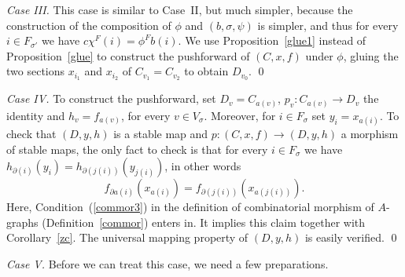 \documentclass[11pt]{amsart}
\theoremstyle{definition}
\theoremstyle{remark}
\newcommand{\del}{\partial}
\newcommand{\s}{_{\sigma}}
\theoremstyle{plain}
\theoremstyle{definition}
\theoremstyle{remark}
\begin{document}
{\em Case III\@. } This case is similar to Case~II, but much simpler, because
the construction of the composition of
\(\phi\) and \((b,\sigma,\psi)\) is simpler, and thus for every \(i\in F_{\sigma'}\)
we have \(c\chi^F(i)=\phi^Fb(i)\). We use
Proposition~\ref{glue1} instead of Proposition~\ref{glue} to construct the
pushforward of \((C,x,f)\) under \(\phi\), gluing
the two sections \(x_{i_1}\) and \(x_{i_2}\) of \(C_{v_1}=C_{v_2}\) to obtain
\(D_{v_0}\). \qed

{\em Case IV\@. } To construct the pushforward, set \(D_v=C_{a(v)}\),
\(p_v:C_{a(v)}\rightarrow D_v\) the identity and
\(h_v=f_{a(v)}\), for every \(v\in V\s\). Moreover, for \(i\in F\s\) set
\(y_i=x_{a(i)}\). To check that \((D,y,h)\) is a stable
map and \(p:(C,x,f)\rightarrow(D,y,h)\) a morphism of stable maps, the only fact
to check is that for every \(i\in F\s\) we
have \(h_{\del(i)}(y_i)=h_{\del(j(i))}(y_{j(i)})\), in other words
\[
f_{\del a(i)}(x_{a(i)})=f_{\del(j(i))}(x_{a(j(i))}).
\]
Here, Condition~(\ref{commor3}) in the definition of combinatorial morphism of
\(A\)-graphs (Definition~\ref{commor})
enters in. It implies this claim together with Corollary~\ref{zc}. The
universal mapping property of \((D,y,h)\) is easily
verified. \qed

{\em Case V\@. }  Before we can treat this case, we need a few preparations.
\end{document}
